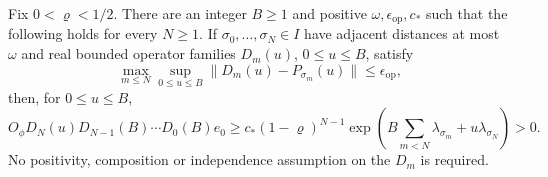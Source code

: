 \begin{lemma}
  \label{L:raw-block-indexed-cone}
  Fix $0 < \varrho < 1/2$. There are an integer $B \ge 1$ and positive
  $\omega,\epsilon_{\mathrm{op}},c_*$ such that the following holds for every $N
  \ge 1$. If $\sigma_0,\ldots,\sigma_N \in I$ have adjacent distances at most
  $\omega$ and real bounded operator families $D_m(u)$, $0 \le u \le B$, satisfy
  \[
    \max_{m\le N}\sup_{0\le u\le B}
    \|D_m(u)-P_{\sigma_m}(u)\|\le\epsilon_{\mathrm{op}},
  \]
  then, for $0 \le u \le B$,
  \begin{equation}\label{E:raw-block-positive-product}
    O_\phi D_N(u)D_{N-1}(B)\cdots D_0(B)e_0
    \ge c_*(1-\varrho)^{N-1}
    \exp\left(B\sum_{m<N}\lambda_{\sigma_m}
    +u\lambda_{\sigma_N}\right)>0.
  \end{equation}
  No positivity, composition or independence assumption on the $D_m$ is
  required.
\end{lemma}

